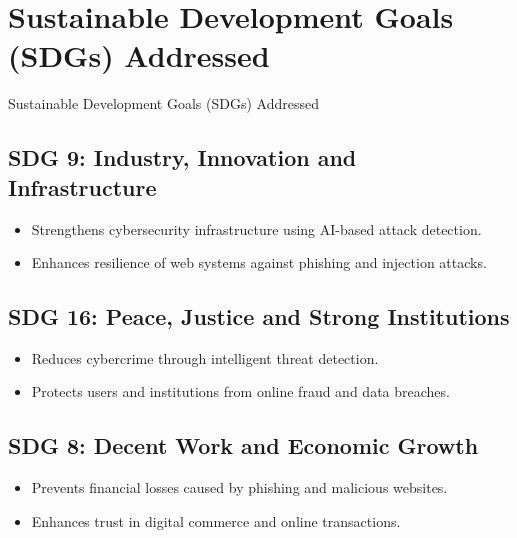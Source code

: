 \documentclass[aspectratio=169,xcolor=dvipsnames]{beamer}
\begin{document}
\section*{Sustainable Development Goals (SDGs) Addressed}
\begin{frame}{Sustainable Development Goals (SDGs) Addressed}
\subsection*{SDG 9: Industry, Innovation and Infrastructure}
\begin{itemize}
    \item Strengthens cybersecurity infrastructure using AI-based attack detection.
    \item Enhances resilience of web systems against phishing and injection attacks.
\end{itemize}

\subsection*{SDG 16: Peace, Justice and Strong Institutions}
\begin{itemize}
    \item Reduces cybercrime through intelligent threat detection.
    \item Protects users and institutions from online fraud and data breaches.
\end{itemize}

\subsection*{SDG 8: Decent Work and Economic Growth}
\begin{itemize}
    \item Prevents financial losses caused by phishing and malicious websites.
    \item Enhances trust in digital commerce and online transactions.
\end{itemize}
\end{frame}
\end{document}
